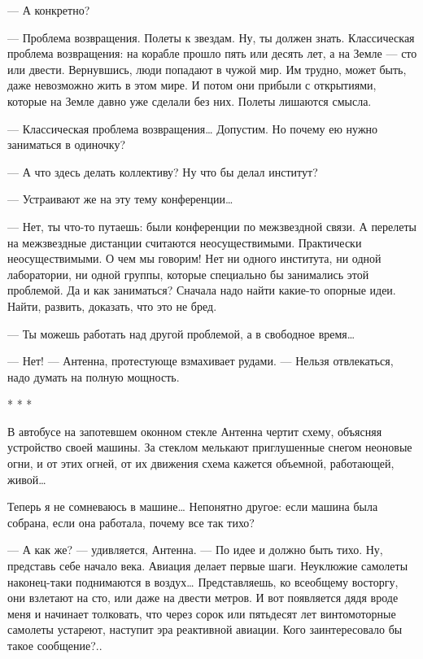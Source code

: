    — А конкретно?

   —  Проблема  возвращения.   Полеты  к  звездам.   Ну,  ты  должен   знать.
   Классическая проблема возвращения: на корабле прошло пять или десять  лет,
   а на Земле —  сто или двести.  Вернувшись, люди попадают  в чужой мир.  Им
   трудно, может быть, даже невозможно жить в этом мире. И потом они  прибыли
   с открытиями, которые на Земле давно уже сделали без них. Полеты  лишаются
   смысла.

   —  Классическая  проблема  возвращения…  Допустим.  Но  почему  ею   нужно
   заниматься в одиночку?

   — А что здесь делать коллективу? Ну что бы делал институт?

   — Устраивают же на эту тему конференции…

   — Нет,  ты  что-то  путаешь:  были конференции  по  межзвездной  связи.  А
   перелеты на межзвездные  дистанции считаются неосуществимыми.  Практически
   неосуществимыми. О  чем мы  говорим!  Нет ни  одного института,  ни  одной
   лаборатории, ни  одной  группы,  которые  специально  бы  занимались  этой
   проблемой. Да и как заниматься? Сначала надо найти какие-то опорные  идеи.
   Найти, развить, доказать, что это не бред.

   — Ты можешь работать над другой проблемой, а в свободное время…

   — Нет! —  Антенна, протестующе  взмахивает рудами.  — Нельзя  отвлекаться,
   надо думать на полную мощность.

                                     * * *

   В автобусе на  запотевшем оконном  стекле Антенна  чертит схему,  объясняя
   устройство своей машины. За стеклом мелькают приглушенные снегом  неоновые
   огни, и от этих огней, от их движения схема кажется объемной,  работающей,
   живой…

   Теперь я  не  сомневаюсь в  машине…  Непонятно другое:  если  машина  была
   собрана, если она работала, почему все так тихо?

   — А как  же? —  удивляется, Антенна.  — По идее  и должно  быть тихо.  Ну,
   представь себе начало века. Авиация делает первые шаги. Неуклюжие самолеты
   наконец-таки поднимаются в воздух…  Представляешь, ко всеобщему  восторгу,
   они взлетают на  сто, или  даже на двести  метров. И  вот появляется  дядя
   вроде меня  и  начинает  толковать,  что через  сорок  или  пятьдесят  лет
   винтомоторные самолеты  устареют, наступит  эра реактивной  авиации.  Кого
   заинтересовало бы такое сообщение?..

